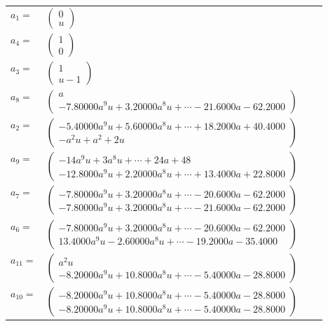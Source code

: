 \documentclass[1p]{elsarticle_modified}
\theoremstyle{definition}
\begin{document}
\begin{tabular}{m{7pt} m{180pt} m{7pt} m{180pt} }
\flushright $a_{1}=$&$\begin{pmatrix}0\\u\end{pmatrix}$ \\
\flushright $a_{4}=$&$\begin{pmatrix}1\\0\end{pmatrix}$ \\
\flushright $a_{3}=$&$\begin{pmatrix}1\\u-1\end{pmatrix}$ \\
\flushright $a_{8}=$&$\begin{pmatrix}a\\-7.80000 a^{9} u+3.20000 a^{8} u+\cdots-21.6000 a-62.2000\end{pmatrix}$ \\
\flushright $a_{2}=$&$\begin{pmatrix}-5.40000 a^{9} u+5.60000 a^{8} u+\cdots+18.2000 a+40.4000\\- a^2 u+a^2+2 u\end{pmatrix}$ \\
\flushright $a_{9}=$&$\begin{pmatrix}-14 a^9 u+3 a^8 u+\cdots+24 a+48\\-12.8000 a^{9} u+2.20000 a^{8} u+\cdots+13.4000 a+22.8000\end{pmatrix}$ \\
\flushright $a_{7}=$&$\begin{pmatrix}-7.80000 a^{9} u+3.20000 a^{8} u+\cdots-20.6000 a-62.2000\\-7.80000 a^{9} u+3.20000 a^{8} u+\cdots-21.6000 a-62.2000\end{pmatrix}$ \\
\flushright $a_{6}=$&$\begin{pmatrix}-7.80000 a^{9} u+3.20000 a^{8} u+\cdots-20.6000 a-62.2000\\13.4000 a^{9} u-2.60000 a^{8} u+\cdots-19.2000 a-35.4000\end{pmatrix}$ \\
\flushright $a_{11}=$&$\begin{pmatrix}a^2 u\\-8.20000 a^{9} u+10.8000 a^{8} u+\cdots-5.40000 a-28.8000\end{pmatrix}$ \\
\flushright $a_{10}=$&$\begin{pmatrix}-8.20000 a^{9} u+10.8000 a^{8} u+\cdots-5.40000 a-28.8000\\-8.20000 a^{9} u+10.8000 a^{8} u+\cdots-5.40000 a-28.8000\end{pmatrix}$ \\

\end{tabular}
\end{document}
